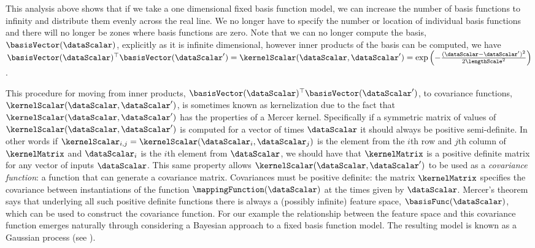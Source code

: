 This analysis above shows that if we take a one dimensional fixed
basis function model, we can increase the number of basis functions to
infinity and distribute them evenly across the real line. We no longer
have to specify the number or location of individual basis functions
and there will no longer be zones where basis functions are zero.
Note that we can no longer compute the basis,
$\basisVector(\dataScalar)$, explicitly as it is infinite dimensional,
however inner products of the basis can be computed, we have
$\basisVector(\dataScalar)^\top \basisVector(\dataScalar^\prime) =
\kernelScalar(\dataScalar, \dataScalar^\prime) =
\exp\left(-\frac{(\dataScalar-\dataScalar^\prime)^2}{2\lengthScale^2}\right)$.

This procedure for moving from inner products,
$\basisVector(\dataScalar)^\top\basisVector(\dataScalar^\prime)$, to
covariance functions, $\kernelScalar(\dataScalar,
\dataScalar^\prime)$, is sometimes known as kernelization
\cite{Scholkopf:learning01} due to the fact that
$\kernelScalar(\dataScalar, \dataScalar^\prime)$ has the properties of
a Mercer kernel. Specifically if a symmetric matrix of values of
$\kernelScalar(\dataScalar, \dataScalar^\prime)$ is computed for a
vector of times $\mathbf{\dataScalar}$ it should always be positive
semi-definite. In other words if $\kernelScalar_{i,j} =
\kernelScalar(\dataScalar_i, \dataScalar_j)$ is the element from the
$i$th row and $j$th column of $\kernelMatrix$ and $\dataScalar_i$ is
the $i$th element from $\mathbf{\dataScalar}$, we should have that
$\kernelMatrix$ is a positive definite matrix for any vector of inputs
$\mathbf{\dataScalar}$. This same property allows
$\kernelScalar(\dataScalar, \dataScalar^\prime)$ to be used as a
\emph{covariance function}: a function that can generate a covariance
matrix. Covariances must be positive definite: the matrix
$\kernelMatrix$ specifies the covariance between instantiations of the
function $\mappingFunction(\dataScalar)$ at the times given by
$\mathbf{\dataScalar}$. Mercer's theorem says that underlying all such
positive definite functions there is always a (possibly infinite)
feature space, $\basisFunc(\dataScalar)$, which can be used to
construct the covariance function. For our example the relationship
between the feature space and this covariance function emerges
naturally through considering a Bayesian approach to a fixed basis
function model. The resulting model is known as a Gaussian process
\citep{Ohagan:curve78,Williams:Gaussian95,Rasmussen:book06} (see
).

